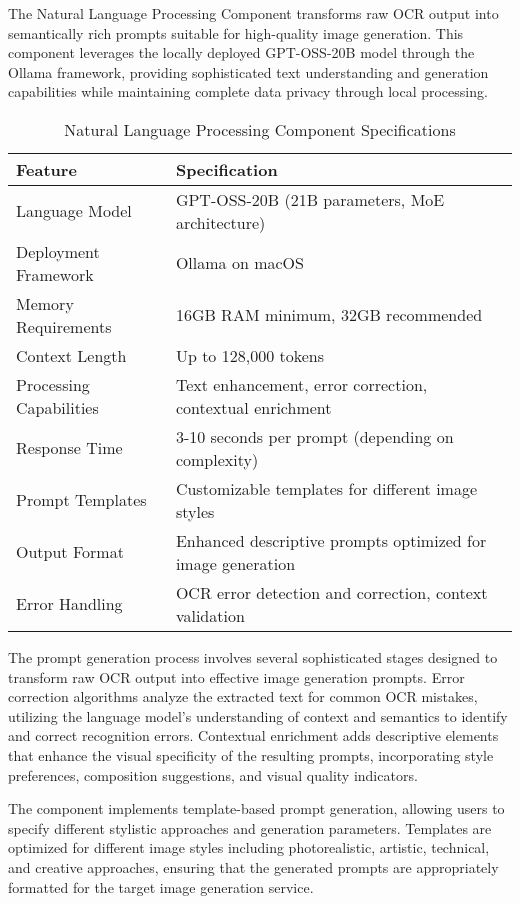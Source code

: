 The Natural Language Processing Component transforms raw OCR output into semantically rich prompts suitable for high-quality image generation. This component leverages the locally deployed GPT-OSS-20B model through the Ollama framework, providing sophisticated text understanding and generation capabilities while maintaining complete data privacy through local processing.

\begin{table}[H]
\centering
\caption{Natural Language Processing Component Specifications}
\label{tab:nlp_specifications}
\begin{tabular}{|l|p{8cm}|}
\hline
\textbf{Feature} & \textbf{Specification} \\
\hline
Language Model & GPT-OSS-20B (21B parameters, MoE architecture) \\
\hline
Deployment Framework & Ollama on macOS \\
\hline
Memory Requirements & 16GB RAM minimum, 32GB recommended \\
\hline
Context Length & Up to 128,000 tokens \\
\hline
Processing Capabilities & Text enhancement, error correction, contextual enrichment \\
\hline
Response Time & 3-10 seconds per prompt (depending on complexity) \\
\hline
Prompt Templates & Customizable templates for different image styles \\
\hline
Output Format & Enhanced descriptive prompts optimized for image generation \\
\hline
Error Handling & OCR error detection and correction, context validation \\
\hline
\end{tabular}
\end{table}

The prompt generation process involves several sophisticated stages designed to transform raw OCR output into effective image generation prompts. Error correction algorithms analyze the extracted text for common OCR mistakes, utilizing the language model's understanding of context and semantics to identify and correct recognition errors. Contextual enrichment adds descriptive elements that enhance the visual specificity of the resulting prompts, incorporating style preferences, composition suggestions, and visual quality indicators.

The component implements template-based prompt generation, allowing users to specify different stylistic approaches and generation parameters. Templates are optimized for different image styles including photorealistic, artistic, technical, and creative approaches, ensuring that the generated prompts are appropriately formatted for the target image generation service.

